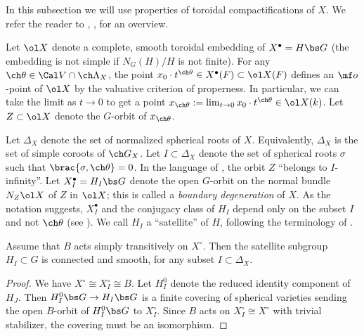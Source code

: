 \subsubsection{}
In this subsection we will use properties of toroidal compactifications of
$X$. We refer the reader to \cite[\S 2.3-2.5]{SV}, \cite{KnLV}, \cite[\S 8]{GN} for an overview.

Let $\ol X$ denote a complete, smooth toroidal embedding of $X^\bullet=H\bs G$
(the embedding is not
simple if $N_G(H)/H$ is not finite).
For any $\ch\theta \in \Cal V \cap \ch\Lambda_X$, the point
$x_0 \cdot t^{\ch\theta} \in X^\bullet(F) \subset \ol X(F)$ defines
an $\mf o$-point of $\ol X$ by the valuative criterion of properness.
In particular, we can take the limit as $t\to 0$ to get a point $x_{\ch\theta}
:= \lim_{t\to 0} x_0 \cdot t^{\ch\theta} \in\ol X(k)$.
Let $Z \subset \ol X$ denote the $G$-orbit of $x_{\ch\theta}$.

Let $\Delta_X$ denote the set of normalized spherical roots of $X$.
Equivalently, $\Delta_X$ is the set of simple coroots of $\ch G_X$.
Let $I \subset \Delta_X$ denote the set of spherical roots $\sigma$
such that $\brac{\sigma, \ch\theta}=0$. In the language of \cite[\S 2.3.6]{SV},
the orbit $Z$ ``belongs to $I$-infinity''. Let $X_I^\bullet = H_I\bs G$ denote
the open $G$-orbit on the normal bundle $N_Z \ol X$ of $Z$ in $\ol X$;
this is called a \emph{boundary degeneration} of $X$.
As the notation suggests, $X_I^\bullet$ and the conjugacy class of $H_I$ depend only on the subset $I$
and not $\ch\theta$ (see \cite[Proposition 2.5.3]{SV}). We call $H_I$ a ``satellite'' of $H$,
following the terminology of \cite{BM}.


\begin{lem}
\notready \label{lem:H_I-conn}
Assume that $B$ acts simply transitively on $X^\circ$.
Then the satellite subgroup $H_I \subset G$ is connected and smooth, for any subset $I\subset \Delta_X$.
\end{lem}
\begin{proof}
We have $X^\circ \cong X_I^\circ \cong B$.
Let $H^0_I$ denote the reduced identity component of $H_J$.
Then $H^0_I\bs G \to H_I\bs G$ is a finite covering of spherical varieties sending the open $B$-orbit
of $H^0_I\bs G$ to $X^\circ_I$. Since $B$ acts on $X^\circ_I\cong X^\circ$ with
trivial stabilizer, the covering must be an isomorphism.
\end{proof}


